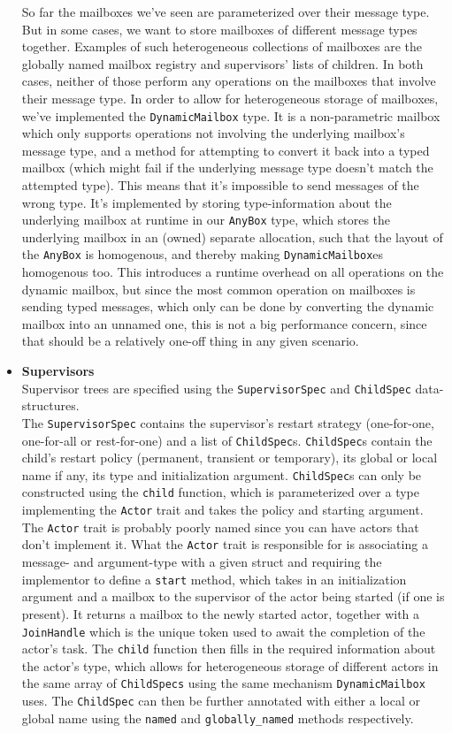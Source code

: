 \documentclass[a4paper]{article}
\begin{document}
\begin{itemize}
So far the mailboxes we've seen are parameterized over their message type. But in
some cases, we want to store mailboxes of different message types together.
Examples of such heterogeneous collections of mailboxes are the globally named
mailbox registry and supervisors' lists of children. In both cases, neither of
those perform any operations on the mailboxes that involve their message type.
In order to allow for heterogeneous storage of mailboxes, we've implemented the
\texttt{DynamicMailbox} type. It is a non-parametric mailbox which only supports
operations not involving the underlying mailbox's message type, and a method for
attempting to convert it back into a typed mailbox (which might fail if the
underlying message type doesn't match the attempted type). This means that it's
impossible to send messages of the wrong type.
It's implemented by
storing type-information about the underlying mailbox at runtime in our
\texttt{AnyBox} type, which stores the underlying mailbox in an (owned) separate
allocation, such that the layout of the \texttt{AnyBox} is homogenous, and
thereby making \texttt{DynamicMailbox}es homogenous too.
This introduces a runtime overhead on
all operations on the dynamic mailbox, but since the most common operation on
mailboxes is sending typed messages, which only can be done by converting the
dynamic mailbox into an unnamed one, this is not a big performance concern,
since that should be a relatively one-off thing in any given scenario.

\item{\bf Supervisors} \\
Supervisor trees are specified using the \texttt{SupervisorSpec} and
\texttt{ChildSpec} data-structures. \\ The \texttt{SupervisorSpec} contains the
supervisor's restart strategy (one-for-one, one-for-all or rest-for-one) and a
list of \texttt{ChildSpec}s. \texttt{ChildSpec}s contain the child's restart
policy (permanent, transient or temporary), its global or local name if any,
its type and initialization argument. \texttt{ChildSpec}s can only be
constructed using the \texttt{child} function, which is parameterized over a type
implementing the \texttt{Actor} trait and takes the policy and starting
argument. The \texttt{Actor} trait is probably poorly named since you can have
actors that don't implement it. What the \texttt{Actor} trait is responsible for
is associating a message- and argument-type with a given struct and requiring
the implementor to define a \texttt{start} method, which takes in an
initialization argument and a mailbox to the supervisor of the actor being
started (if one is present). It returns a mailbox to the newly started actor,
together with a \texttt{JoinHandle} which is the unique token used to await the
completion of the actor's task. The \texttt{child} function then fills in the
required information about the actor's type, which allows for heterogeneous
storage of different actors in the same array of \texttt{ChildSpecs} using the
same mechanism \texttt{DynamicMailbox} uses. The \texttt{ChildSpec} can then be
further annotated with either a local or global name using the \texttt{named} and
\texttt{globally\_named} methods respectively.


\end{itemize}
\end{document}
